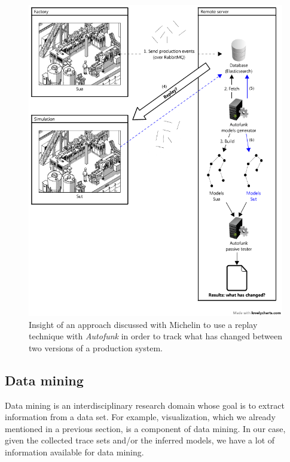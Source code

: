 \begin{figure}[h]
    \begin{center}
        \includegraphics[width=0.96\linewidth]{figures/autofunk_active.png}
    \end{center}

    \caption{Insight of an approach discussed with Michelin to
    use a replay technique with \textit{Autofunk} in order to
    track what has changed between two versions of a production
    system.}
    \label{fig:autofunk_active}
\end{figure}
\clearpage

\subsection{Data mining}
\label{sec:conclusion:testing:data}

Data mining \cite{chakrabarti2006data} is an interdisciplinary
research domain whose goal is to extract information from a data
set. For example, visualization, which we already mentioned in a
previous section, is a component of data mining. In our case,
given the collected trace sets and/or the inferred models, we
have a lot of information available for data mining.

